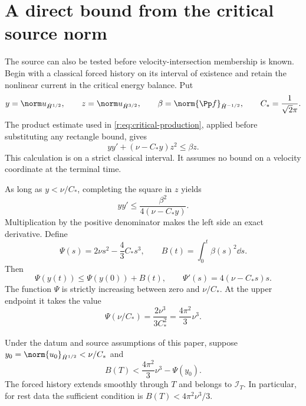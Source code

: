 \section{A direct bound from the critical source norm}
\label{r:app:critical-source}

The source can also be tested before velocity-intersection membership is
known. Begin with a classical forced history on its interval of existence
and retain the nonlinear current in the critical energy balance. Put
\[
 y=\norm u_{\dot H^{1/2}},\qquad
 z=\norm u_{\dot H^{3/2}},\qquad
 \beta=\norm{\Pp f}_{\dot H^{-1/2}},\qquad
 C_*=\frac1{\sqrt2\pi}.
\]
The product estimate used in \eqref{r:eq:critical-production}, applied
before substituting any rectangle bound, gives
\begin{equation}
 y y'+(\nu-C_*y)z^2\le\beta z.
 \label{r:eq:critical-source-energy}
\end{equation}
This calculation is on a strict classical interval. It assumes no bound
on a velocity coordinate at the terminal time.

As long as \(y<\nu/C_*\), completing the square in \(z\) yields
\[
 y y'\le\frac{\beta^2}{4(\nu-C_*y)}.
\]
Multiplication by the positive denominator makes the left side an exact
derivative. Define
\[
 \Psi(s)=2\nu s^2-\frac43C_*s^3,\qquad
 B(t)=\int_0^t\beta(s)^2\dd s.
\]
Then
\begin{equation}
 \Psi(y(t))\le\Psi(y(0))+B(t),\qquad
 \Psi'(s)=4(\nu-C_*s)s.
 \label{r:eq:critical-source-primitive}
\end{equation}
The function \(\Psi\) is strictly increasing between zero and
\(\nu/C_*\). At the upper endpoint it takes the value
\[
 \Psi(\nu/C_*)=\frac{2\nu^3}{3C_*^2}
 =\frac{4\pi^2}{3}\nu^3.
\]

\begin{theorem}\label{r:thm:critical-source}
Under the datum and source assumptions of this paper, suppose
\(y_0=\norm{u_0}_{\dot H^{1/2}}<\nu/C_*\) and
\begin{equation}
 B(T)<\frac{4\pi^2}{3}\nu^3-\Psi(y_0).
 \label{r:eq:critical-source-condition}
\end{equation}
The forced history extends smoothly through \(T\) and belongs to
\(\mathscr I_T\). In particular, for rest data the sufficient condition is
\(B(T)<4\pi^2\nu^3/3\).
\end{theorem}


